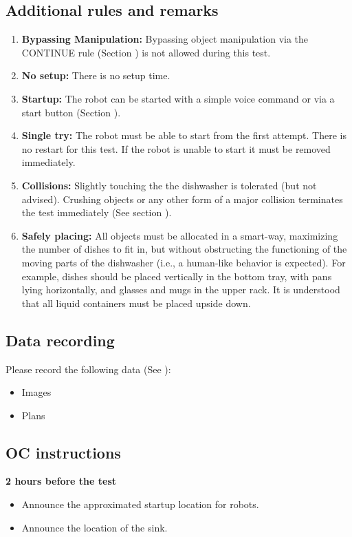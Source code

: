 \subsection{Additional rules and remarks}
\begin{enumerate}
	\item \textbf{Bypassing Manipulation:} Bypassing object manipulation via the CONTINUE rule (Section ) is not allowed during this test.
	\item \textbf{No setup:} There is no setup time.
	\item \textbf{Startup:} The robot can be started with a simple voice command or via a start button (Section ). 
	\item \textbf{Single try:} The robot must be able to start from the first attempt. There is no restart for this test. If the robot is unable to start it must be removed immediately.
	\item \textbf{Collisions:} Slightly touching the the dishwasher is tolerated (but not advised). Crushing objects or any other form of a major collision terminates the test immediately (See section ).
	\item \textbf{Safely placing:} All objects must be allocated in a smart-way, maximizing the number of dishes to fit in, but without obstructing the functioning of the moving parts of the dishwasher (i.e., a human-like behavior is expected). For example, dishes should be placed vertically in the bottom tray, with pans lying horizontally, and glasses and mugs in the upper rack. It is understood that all liquid containers must be placed upside down.
\end{enumerate}

\subsection{Data recording}
Please record the following data (See ):
\begin{itemize}
	\item Images
	\item Plans
\end{itemize}

\subsection{OC instructions}

\textbf{2 hours before the test}
\begin{itemize}
    \item Announce the approximated startup location for robots.
    \item Announce the location of the sink.
\end{itemize}

